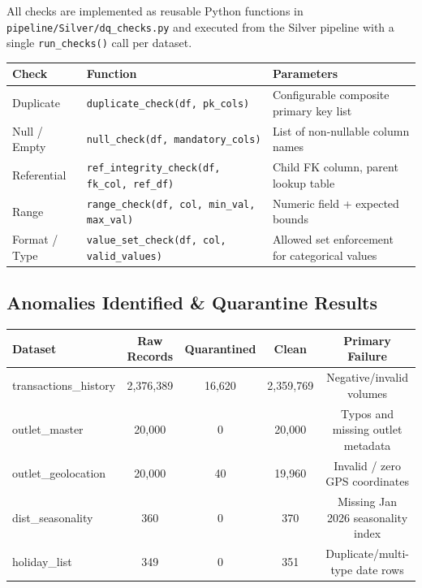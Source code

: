 \documentclass[11pt, a4paper]{article}
\begin{document}
All checks are implemented as reusable Python functions in
\texttt{pipeline/Silver/dq\_checks.py} and executed from the Silver pipeline with a
single \texttt{run\_checks()} call per dataset.

\begin{infobox}
\begin{tabularx}{\linewidth}{l p{5.5cm} X}
  \toprule
  \textbf{Check} & \textbf{Function} & \textbf{Parameters} \\
  \midrule
  Duplicate       & \texttt{duplicate\_check(df, pk\_cols)}
                  & Configurable composite primary key list \\
  Null / Empty    & \texttt{null\_check(df, mandatory\_cols)}
                  & List of non-nullable column names \\
  Referential     & \texttt{ref\_integrity\_check(df, fk\_col, ref\_df)}
                  & Child FK column, parent lookup table \\
  Range           & \texttt{range\_check(df, col, min\_val, max\_val)}
                  & Numeric field + expected bounds \\
  Format / Type   & \texttt{value\_set\_check(df, col, valid\_values)}
                  & Allowed set enforcement for categorical values \\
  \bottomrule
\end{tabularx}
\end{infobox}

\subsection{Anomalies Identified \& Quarantine Results}

\begin{center}
\small
\begin{tabular}{lcccc}
  \toprule
  \textbf{Dataset} & \textbf{Raw Records} & \textbf{Quarantined} & \textbf{Clean} & \textbf{Primary Failure} \\
  \midrule
  transactions\_history & 2,376,389 & 16,620 & 2,359,769 & Negative/invalid volumes \\
  outlet\_master        & 20,000 & 0 & 20,000 & Typos and missing outlet metadata \\
  outlet\_geolocation   & 20,000 & 40 & 19,960 & Invalid / zero GPS coordinates \\
  dist\_seasonality     & 360 & 0 & 370 & Missing Jan 2026 seasonality index \\
  holiday\_list         & 349 & 0 & 351 & Duplicate/multi-type date rows \\
  \bottomrule
\end{tabular}
\end{center}
\end{document}
